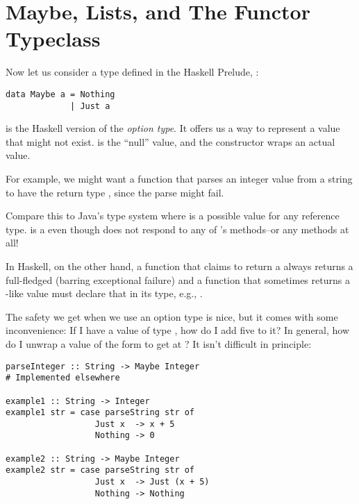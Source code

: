 \section{Maybe, Lists, and The Functor Typeclass}

Now let us consider a type defined in the Haskell Prelude, :

\begin{lstlisting}
data Maybe a = Nothing
             | Just a
\end{lstlisting}

\begin{notelist}
    \item {} is the Haskell version of the \textit{option type}. It offers us a way to
          represent a value that might not exist.  is the ``null'' value, and
          the  constructor wraps an actual value.
    \item For example, we might want a function that parses an integer value from a string to
          have the return type , since the parse might fail.
    \item Compare this to Java's type system where  is a possible value for any
          reference type.  is a  even though  does not respond to  
          any of 's methods--or any methods at all!
    \item In Haskell, on the other hand, a function that claims to return a  always returns
          a full-fledged  (barring exceptional failure) and a function that sometimes
          returns a -like value must declare that in its type, e.g., .
\end{notelist}

The safety we get when we use an option type is nice, but it comes with some inconvenience: If I 
have a value of type , how do I add five to it? In general, how do I unwrap
a value of the form  to get at ? It isn't difficult in principle:

\begin{lstlisting}
parseInteger :: String -> Maybe Integer
# Implemented elsewhere

example1 :: String -> Integer
example1 str = case parseString str of
                  Just x  -> x + 5
                  Nothing -> 0

example2 :: String -> Maybe Integer
example2 str = case parseString str of
                  Just x  -> Just (x + 5)
                  Nothing -> Nothing
\end{lstlisting}

